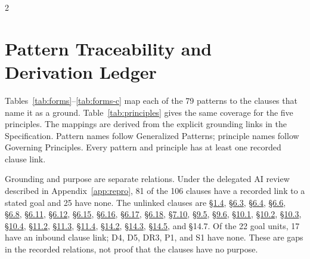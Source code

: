 \begin{multicols}{2}
\section{Pattern Traceability and Derivation Ledger}
\label{app:coverage}
\setcounter{table}{0}
\setcounter{figure}{0}

Tables~\ref{tab:forms}--\ref{tab:forms-c} map each of the 79 patterns to the clauses that name it as a ground. Table~\ref{tab:principles} gives the same coverage for the five principles. The mappings are derived from the explicit grounding links in the Specification. Pattern names follow Generalized Patterns; principle names follow Governing Principles. Every pattern and principle has at least one recorded clause link.

Grounding and purpose are separate relations. Under the delegated AI review described in Appendix~\ref{app:repro}, 81 of the 106 clauses have a recorded link to a stated goal and 25 have none. The unlinked clauses are \hyperlink{nss-1.4}{\S1.4}, \hyperlink{nss-6.3}{\S6.3}, \hyperlink{nss-6.4}{\S6.4}, \hyperlink{nss-6.6}{\S6.6}, \hyperlink{nss-6.8}{\S6.8}, \hyperlink{nss-6.11}{\S6.11}, \hyperlink{nss-6.12}{\S6.12}, \hyperlink{nss-6.15}{\S6.15}, \hyperlink{nss-6.16}{\S6.16}, \hyperlink{nss-6.17}{\S6.17}, \hyperlink{nss-6.18}{\S6.18}, \hyperlink{nss-7.10}{\S7.10}, \hyperlink{nss-9.5}{\S9.5}, \hyperlink{nss-9.6}{\S9.6}, \hyperlink{nss-10.1}{\S10.1}, \hyperlink{nss-10.2}{\S10.2}, \hyperlink{nss-10.3}{\S10.3}, \hyperlink{nss-10.4}{\S10.4}, \hyperlink{nss-11.2}{\S11.2}, \hyperlink{nss-11.3}{\S11.3}, \hyperlink{nss-11.4}{\S11.4}, \hyperlink{nss-14.2}{\S14.2}, \hyperlink{nss-14.3}{\S14.3}, \hyperlink{nss-14.5}{\S14.5}, and \S14.7. Of the 22 goal units, 17 have an inbound clause link; D4, D5, DR3, P1, and S1 have none. These are gaps in the recorded relations, not proof that the clauses have no purpose.
\end{multicols}

